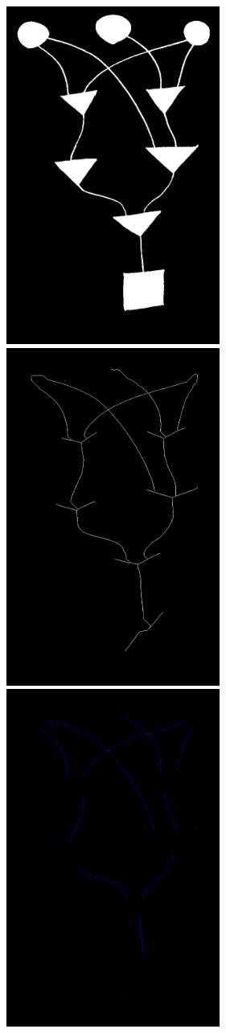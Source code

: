 \documentclass[makeidx, a4paper, 14pt]{extarticle}
\begin{document}
\begin{figure}[H]
    \centering
    \includegraphics[width=70mm]{handwritten_1_processed_image.png}
    \includegraphics[width=70mm]{handwritten_1_image_skelet.png}
    \includegraphics[width=70mm]{handwritten_1_classified_pixels.png}

\end{figure}
\end{document}
